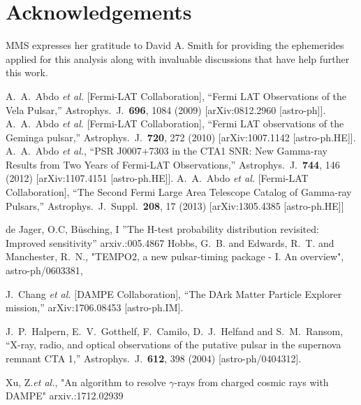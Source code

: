 \documentclass{PoS}
\begin{document}
\section{Acknowledgements}
MMS expresses her gratitude to David A. Smith for providing the ephemerides applied for this analysis along with invaluable discussions that have help further this work.



\begin{thebibliography}{99}

  A.~A.~Abdo {\it et al.} [Fermi-LAT Collaboration],
  ``Fermi LAT Observations of the Vela Pulsar,''
  Astrophys.\ J.\  {\bf 696}, 1084 (2009)
  [arXiv:0812.2960 [astro-ph]].
  A.~A.~Abdo {\it et al.} [Fermi-LAT Collaboration],
  ``Fermi LAT observations of the Geminga pulsar,''
  Astrophys.\ J.\  {\bf 720}, 272 (2010)
  [arXiv:1007.1142 [astro-ph.HE]].
  A.~A.~Abdo {\it et al.},
  ``PSR J0007+7303 in the CTA1 SNR: New Gamma-ray Results from Two Years of Fermi-LAT Observations,''
  Astrophys.\ J.\  {\bf 744}, 146 (2012)
  [arXiv:1107.4151 [astro-ph.HE]].
  A.~A.~Abdo {\it et al.} [Fermi-LAT Collaboration],
  ``The Second Fermi Large Area Telescope Catalog of Gamma-ray Pulsars,''
  Astrophys.\ J.\ Suppl.\  {\bf 208}, 17 (2013)
  [arXiv:1305.4385 [astro-ph.HE]]

de Jager, O.C, Büsching, I
''The H-test probability distribution revisited: Improved sensitivity''
    arxiv.:005.4867
{{Hobbs}, G.~B. and {Edwards}, R.~T. and {Manchester}, R.~N.},
"{TEMPO2, a new pulsar-timing package - I. An overview}",
{astro-ph/0603381},

  J.~Chang {\it et al.} [DAMPE Collaboration],
  ``The DArk Matter Particle Explorer mission,''
  arXiv:1706.08453 [astro-ph.IM].

J.~P.~Halpern, E.~V.~Gotthelf, F.~Camilo, D.~J.~Helfand and S.~M.~Ransom,
 ``X-ray, radio, and optical observations of the putative pulsar in the supernova remnant CTA 1,''
  Astrophys.\ J.\  {\bf 612}, 398 (2004)
  [astro-ph/0404312].

Xu, Z.{\it et al.},
"An algorithm to resolve $\gamma$-rays from charged cosmic rays with DAMPE"
arxiv.:1712.02939


\end{thebibliography}
\end{document}
